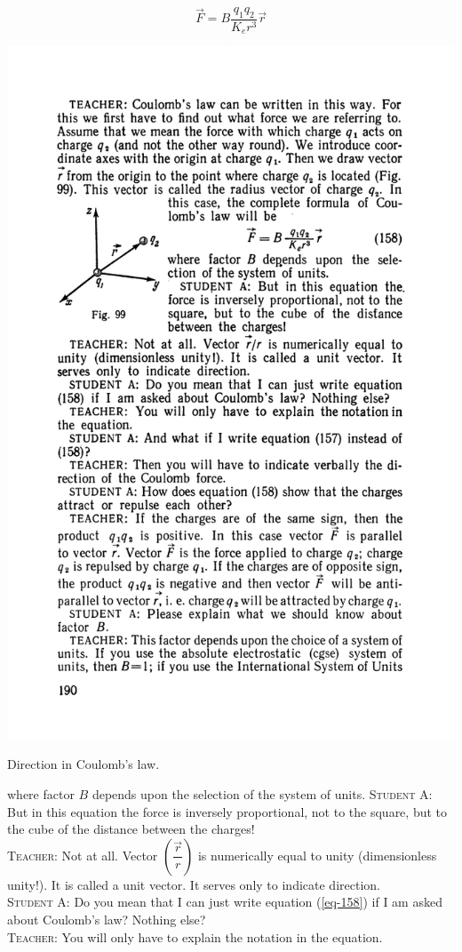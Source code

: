 \documentclass[a4paper,sfsidenotes]{tufte-book}
\begin{document}
\begin{equation}%
\vec{F} = B \frac{q_{1}q_{2}}{K_{e}r^{3}} \vec{r}
\label{eq-158}
\end{equation}
\begin{marginfigure}%
\centering
\includegraphics[width=.8\linewidth]{fig-099a}
\caption{Direction in Coulomb's law.}
\label{fig-99}
\end{marginfigure}
where factor $B$ depends upon the selection of the system of units.
\textsc{Student A:} But in this equation the force is inversely proportional, not to the
square, but to the cube of the distance between the charges!
\\
\textsc{Teacher:} Not at all. Vector $\left( \dfrac{\vec{r}}{r} \right)$ is numerically equal to unity (dimensionless unity!). It is called a unit vector. It serves only to indicate direction.
\\
\textsc{Student A:} Do you mean that I can just write equation (\ref{eq-158}) if I am asked about Coulomb's law? Nothing else?
\\
\textsc{Teacher:} You will only have to explain the notation in the equation.
\end{document}

